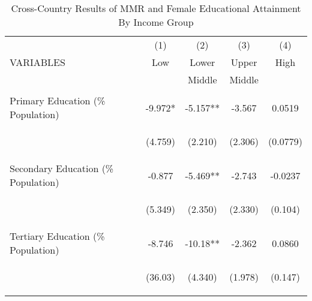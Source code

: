 \begin{table}[htpb!]\begin{center}\caption{Cross-Country Results of MMR and Female Educational Attainment By Income Group}\label{MMRtab:MMRincome}\begin{tabular}{lcccc}\toprule 
 &(1)&(2)&(3)&(4)\\VARIABLES&Low&Lower&Upper&High\\&&Middle&Middle&\\ \midrule
 \vspace{4pt}&\begin{footnotesize}\end{footnotesize}&\begin{footnotesize}\end{footnotesize}&\begin{footnotesize}\end{footnotesize}&\begin{footnotesize}\end{footnotesize}\\Primary Education (\% Population) &-9.972*&-5.157**&-3.567&0.0519\\
&\begin{footnotesize}(4.759)\end{footnotesize}&\begin{footnotesize}(2.210)\end{footnotesize}&\begin{footnotesize}(2.306)\end{footnotesize}&\begin{footnotesize}(0.0779)\end{footnotesize}\\
Secondary Education (\% Population) &-0.877&-5.469**&-2.743&-0.0237\\
&\begin{footnotesize}(5.349)\end{footnotesize}&\begin{footnotesize}(2.350)\end{footnotesize}&\begin{footnotesize}(2.330)\end{footnotesize}&\begin{footnotesize}(0.104)\end{footnotesize}\\
Tertiary Education (\% Population) &-8.746&-10.18**&-2.362&0.0860\\
&\begin{footnotesize}(36.03)\end{footnotesize}&\begin{footnotesize}(4.340)\end{footnotesize}&\begin{footnotesize}(1.978)\end{footnotesize}&\begin{footnotesize}(0.147)\end{footnotesize}\\

\end{tabular}
\end{center}
\end{table}

